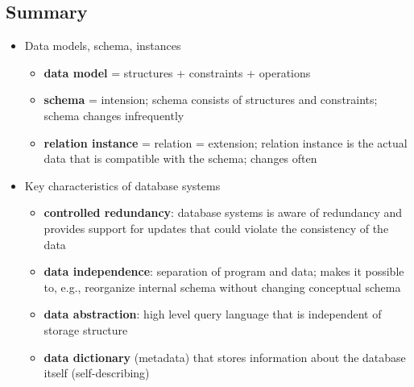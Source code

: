 \subsection{Summary}
\begin{itemize}[label=\(\rhd\)]
    \item Data models, schema, instances
    \begin{itemize}[label=\(\rhd\)]
        \item \textbf{data model} = structures + constraints + operations
        \item \textbf{schema} = intension; schema consists of structures and constraints; schema changes infrequently 
        \item \textbf{relation instance} = relation = extension; relation instance is the actual data that is compatible with the schema; changes often
    \end{itemize}
    \item Key characteristics of database systems
    \begin{itemize}[label=\(\rhd\)]
        \item \textbf{controlled redundancy}: database systems is aware of redundancy and provides support for updates that could violate the consistency of the data
        \item \textbf{data independence}: separation of program and data; makes it possible to, e.g., reorganize internal schema without changing conceptual schema
        \item \textbf{data abstraction}: high level query language that is independent of storage structure
        \item \textbf{data dictionary} (metadata) that stores information about the database itself (self-describing)
    \end{itemize}
\end{itemize}